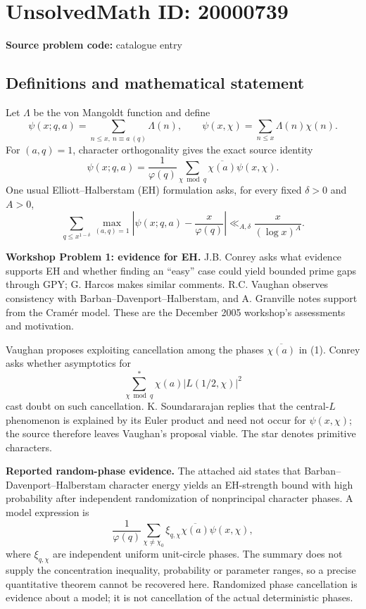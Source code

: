 \documentclass[11pt]{article}
\begin{document}
\section*{UnsolvedMath ID: 20000739}
\textbf{Source problem code:} catalogue entry
\subsection{Definitions and mathematical statement}
Let $\Lambda$ be the von Mangoldt function and define
\[
 \psi(x;q,a)=\sum_{n\leq x,\ n\equiv a\ (q)}\Lambda(n),\qquad
 \psi(x,\chi)=\sum_{n\leq x}\Lambda(n)\chi(n).
\]
For $(a,q)=1$, character orthogonality gives the exact source identity
\[
 \psi(x;q,a)=\frac1{\varphi(q)}\sum_{\chi\bmod q}\overline{\chi(a)}\psi(x,\chi).\tag{1}
\]
One usual Elliott--Halberstam (EH) formulation asks, for every fixed $\delta>0$ and $A>0$,
\[
 \sum_{q\leq x^{1-\delta}}\max_{(a,q)=1}
 \left|\psi(x;q,a)-\frac{x}{\varphi(q)}\right|
 \ll_{A,\delta}\frac{x}{(\log x)^A}.
\]

\textbf{Workshop Problem 1: evidence for EH.} J.B. Conrey asks what evidence supports EH and whether finding an ``easy'' case could yield bounded prime gaps through GPY; G. Harcos makes similar comments. R.C. Vaughan observes consistency with Barban--Davenport--Halberstam, and A. Granville notes support from the Cram\'er model. These are the December 2005 workshop's assessments and motivation.

Vaughan proposes exploiting cancellation among the phases $\overline{\chi(a)}$ in (1). Conrey asks whether asymptotics for
\[
 \sum_{\chi\bmod q}^{*}\chi(a)|L(1/2,\chi)|^2
\]
cast doubt on such cancellation. K. Soundararajan replies that the central-$L$ phenomenon is explained by its Euler product and need not occur for $\psi(x,\chi)$; the source therefore leaves Vaughan's proposal viable. The star denotes primitive characters.

\textbf{Reported random-phase evidence.} The attached aid states that Barban--Davenport--Halberstam character energy yields an EH-strength bound with high probability after independent randomization of nonprincipal character phases. A model expression is
\[
 \frac1{\varphi(q)}\sum_{\chi\ne\chi_0}\xi_{q,\chi}\overline{\chi(a)}\psi(x,\chi),
\]
where $\xi_{q,\chi}$ are independent uniform unit-circle phases. The summary does not supply the concentration inequality, probability or parameter ranges, so a precise quantitative theorem cannot be recovered here. Randomized phase cancellation is evidence about a model; it is not cancellation of the actual deterministic phases.
\end{document}
